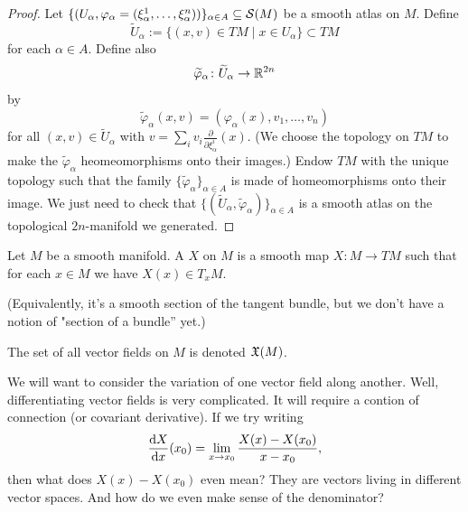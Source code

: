 \begin{proof}
Let
$\{(U_{\alpha},\varphi_{\alpha}=(\xi^{1}_{\alpha},\dots,\xi^{n}_{\alpha}))\}_{\alpha\in A}\subseteq\mathcal{S}(M)$
be a smooth atlas on $M$. Define 
\begin{equation}
\widetilde{U}_{\alpha}:=\{(x,v)\in TM\mid x\in U_{\alpha}\}\subset TM
\end{equation}
for each $\alpha\in A$. Define also
\begin{equation}
\widetilde{\varphi}_{\alpha}\colon\widetilde{U}_{\alpha}\to\mathbb{R}^{2n}
\end{equation}
by
\begin{equation}
\widetilde{\varphi}_{\alpha}(x,v)=(\varphi_{\alpha}(x),v_{1},\dots,v_{n})
\end{equation}
for all $(x,v)\in\widetilde{U}_{\alpha}$ with $v=\sum_{i}v_{i}\frac{\partial}{\partial\xi^{i}_{\alpha}}(x)$.
(We choose the topology on $TM$ to make the
$\widetilde{\varphi}_{\alpha}$ heomeomorphisms onto their images.)
Endow $TM$ with the unique topology such that the family
$\{\widetilde{\varphi}_{\alpha}\}_{\alpha\in A}$ is made of
homeomorphisms onto their image. We just need to check that
$\{(\widetilde{U}_{\alpha},\widetilde{\varphi}_{\alpha})\}_{\alpha\in A}$
is a smooth atlas on the topological $2n$-manifold we generated.
\end{proof}

\begin{definition}
Let $M$ be a smooth manifold. A  $X$ on $M$ is a
smooth map $X\colon M\to TM$ such that for each $x\in M$ we have
$X(x)\in T_{x}M$.

(Equivalently, it's a smooth section of the tangent bundle, but we
don't have a notion of "section of a bundle'' yet.)
\end{definition}

\begin{notation}
The set of all vector fields on $M$ is denoted $\mathfrak{X}(M)$.
\end{notation}

\begin{node}
We will want to consider the variation of one vector field along
another. Well, differentiating vector fields is very complicated. It
will require a contion of connection (or covariant derivative). If we
try writing
\begin{equation}
\frac{\mathrm{d} X}{\mathrm{d} x}(x_{0})=\lim_{x\to x_{0}}\frac{X(x)-X(x_{0})}{x-x_{0}},
\end{equation}
then what does $X(x)-X(x_{0})$ even mean? They are vectors living in
different vector spaces. And how do we even make sense of the denominator?
\end{node}

